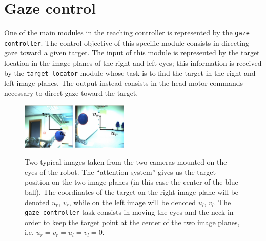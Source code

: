 \section{Gaze control}
\label{Sec:gazecontrol}

One of the main modules in the reaching controller is represented 
by the {\tt gaze controller}. The control objective of this specific 
module consists in directing gaze toward a given target. The input of 
this module is represented by the target location in the image planes of 
the right and left eyes; this information is received by the {\tt target 
locator} module whose task is to find the target in the right and left 
image planes. The output instead consists in the head motor commands 
necessary to direct gaze toward the target. 

\begin{figure}[tbp]
\centering
\includegraphics[width=25mm]{Figure/LeftImage.eps} \hspace{1cm}
\includegraphics[width=25mm]{Figure/RightImage.eps}
\caption{Two typical images taken from the two cameras mounted on the 
eyes of the robot. The ``attention system'' gives us the target position 
on the two image planes (in this case the center of the blue ball). 
The coordinates of the target on the right image plane will be denoted 
$u_r$, $v_r$, while on the left image will be denoted $u_l$, $v_l$. 
The {\tt gaze controller} task consists in moving the eyes and the 
neck in order to keep the target point at the center of the two image 
planes, i.e. $u_r = v_r = u_l = v_l = 0$.}
\label{Fig:ImagePlane}
\end{figure}
 
